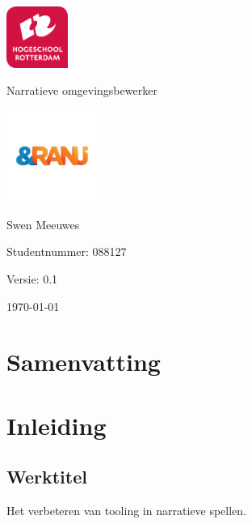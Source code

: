 \documentclass{report}
\newcommand{\versionnumber}{0.1}
\newcommand{\name}{Swen Meeuwes}
\newcommand{\studentnumber}{088127}
\renewcommand{\title}{Narratieve omgevingsbewerker}
\newcommand{\subtitle}{Sub title}
\begin{document}
\begin{titlepage}
        \centering
        \includegraphics[width=2cm]{Images/University}\par
        \vspace{4\baselineskip}
        {\Huge\title\par}
        \par
        \includegraphics[width=3cm]{Images/Organisation}
        \vspace{4\baselineskip}
        \par
        {\Large\name\par}
        {Studentnummer: \studentnumber\par}
        \vfill
        {\hfill Versie: \versionnumber\par}
        {\hfill \today}
\end{titlepage}

\chapter*{Samenvatting}

\newpage

\tableofcontents

\newpage

\chapter{Inleiding}
\section{Werktitel}
Het verbeteren van tooling in narratieve spellen.
\end{document}
